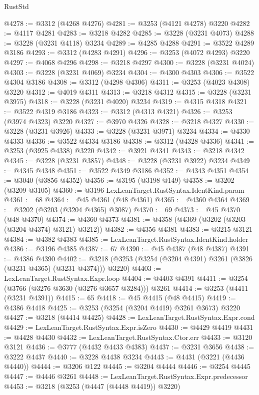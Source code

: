 \begin{lexlean}{RustStd}
\begin{coremodule}
{\begin{coremodule}
{{{{{{{{{{{{{{{{{{{{{{{{{{{{{{{{{{{{{@4278 := @3312 (@4268 @4276)
@4281 := @3253 (@4121 @4278) @3220
@4282 := @4117 @4281
@4283 := @3218 @4282
@4285 := @3228 (@3231 @4073)
@4288 := @3228 (@3231 @4118) @3234
@4289 := @4285 @4288
@4291 := @3522 @4289 @3186
@4293 := @3312 (@4283 @4291)
@4296 := @3253 (@4072 @4293) @3220
@4297 := @4068 @4296
@4298 := @3218 @4297
@4300 := @3228 (@3231 @4024)
@4303 := @3228 (@3231 @4069) @3234
@4304 := @4300 @4303
@4306 := @3522 @4304 @3186
@4308 := @3312 (@4298 @4306)
@4311 := @3253 (@4023 @4308) @3220
@4312 := @4019 @4311
@4313 := @3218 @4312
@4315 := @3228 (@3231 @3975)
@4318 := @3228 (@3231 @4020) @3234
@4319 := @4315 @4318
@4321 := @3522 @4319 @3186
@4323 := @3312 (@4313 @4321)
@4326 := @3253 (@3974 @4323) @3220
@4327 := @3970 @4326
@4328 := @3218 @4327
@4330 := @3228 (@3231 @3926)
@4333 := @3228 (@3231 @3971) @3234
@4334 := @4330 @4333
@4336 := @3522 @4334 @3186
@4338 := @3312 (@4328 @4336)
@4341 := @3253 (@3925 @4338) @3220
@4342 := @3921 @4341
@4343 := @3218 @4342
@4345 := @3228 (@3231 @3857)
@4348 := @3228 (@3231 @3922) @3234
@4349 := @4345 @4348
@4351 := @3522 @4349 @3186
@4352 := @4343 @4351
@4354 := @3040 (@3856 @4352)
@4356 := @3195 (@3198 @149)
@4358 := @3202 (@3209 @3105)
@4360 := @3196 LexLeanTarget.RustSyntax.IdentKind.param
@4361 := 68
@4364 := @45 @4361 (@48 @4361)
@4365 := @4360 @4364
@4369 := @3202 (@3203 (@3204 @4365) @3087)
@4370 := 69
@4373 := @45 @4370 (@48 @4370)
@4374 := @4360 @4373
@4381 := @4358 (@4369 (@3202 (@3203 (@3204 @4374) @3121) @3212))
@4382 := @4356 @4381
@4383 := @3215 @3121
@4384 := @4382 @4383
@4385 := LexLeanTarget.RustSyntax.IdentKind.holder
@4386 := @3196 @4385
@4387 := 67
@4390 := @45 @4387 (@48 @4387)
@4391 := @4386 @4390
@4402 := @3218 (@3253 (@3254 (@3204 @4391) @3261 (@3826 (@3231 @4365) (@3231 @4374))) @3220)
@4403 := LexLeanTarget.RustSyntax.Expr.loop
@4404 := @4403 @4391
@4411 := @3254 (@3766 (@3276 @3630 (@3276 @3657 @3284))) @3261
@4414 := @3253 (@4411 (@3231 @4391))
@4415 := 65
@4418 := @45 @4415 (@48 @4415)
@4419 := @4386 @4418
@4425 := @3253 (@3254 (@3204 @4419) @3261 @3673) @3220
@4427 := @3218 (@4414 @4425)
@4428 := LexLeanTarget.RustSyntax.Expr.cond
@4429 := LexLeanTarget.RustSyntax.Expr.isZero
@4430 := @4429 @4419
@4431 := @4428 @4430
@4432 := LexLeanTarget.RustSyntax.Ctor.err
@4433 := @3120 @3121
@4436 := @3777 (@4432 @4433 @4383)
@4437 := @3231 @3656
@4438 := @3222 @4437
@4440 := @3228 @4438 @3234
@4443 := @4431 (@3221 (@4436 @4440))
@4444 := @3206 @122
@4445 := @3204 @4444
@4446 := @3254 @4445
@4447 := @4446 @3261
@4448 := LexLeanTarget.RustSyntax.Expr.predecessor
@4453 := @3218 (@3253 (@4447 (@4448 @4419)) @3220)
}}}}}}}}}}}}}}}}}}}}}}}}}}}}}}}}}}}}}
\end{coremodule}}
\end{coremodule}
\end{lexlean}
